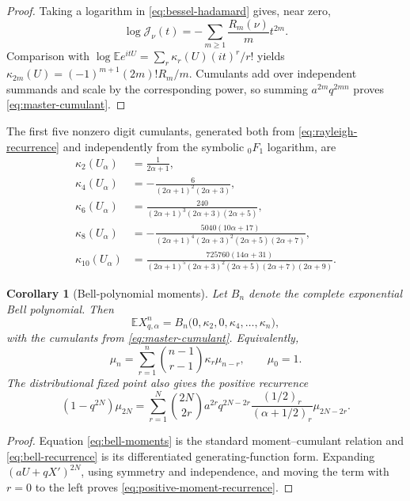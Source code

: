 \documentclass[11pt]{article}
\newtheorem{corollary}[theorem]{Corollary}
\theoremstyle{definition}
\theoremstyle{remark}
\newcommand{\E}{\mathbb{E}}
\newcommand{\Jcal}{\mathcal{J}}
\newcommand{\poch}[2]{\left(#1\right)_{#2}}
\begin{document}
\begin{proof}
Taking a logarithm in \eqref{eq:bessel-hadamard} gives, near zero,
\[
 \log\Jcal_\nu(t)=-\sum_{m\ge1}\frac{R_m(\nu)}m t^{2m}.
\]
Comparison with
\(\log\E e^{itU}=\sum_r\kappa_r(U)(it)^r/r!\) yields
\(\kappa_{2m}(U)=(-1)^{m+1}(2m)!R_m/m\).  Cumulants add over independent
summands and scale by the corresponding power, so summing
\(a^{2m}q^{2mn}\) proves \eqref{eq:master-cumulant}.
\end{proof}

The first five nonzero digit cumulants, generated both from
\eqref{eq:rayleigh-recurrence} and independently from the symbolic
\({}_0F_1\) logarithm, are
\begin{align}
 \kappa_2(U_\alpha)&=\frac1{2\alpha+1},\label{eq:k2}\\
 \kappa_4(U_\alpha)&=-\frac6{(2\alpha+1)^2(2\alpha+3)},\label{eq:k4}\\
 \kappa_6(U_\alpha)&=\frac{240}
 {(2\alpha+1)^3(2\alpha+3)(2\alpha+5)},\label{eq:k6}\\
 \kappa_8(U_\alpha)&=-\frac{5040(10\alpha+17)}
 {(2\alpha+1)^4(2\alpha+3)^2(2\alpha+5)(2\alpha+7)},\label{eq:k8}\\
 \kappa_{10}(U_\alpha)&=\frac{725760(14\alpha+31)}
 {(2\alpha+1)^5(2\alpha+3)^2(2\alpha+5)(2\alpha+7)(2\alpha+9)}.
 \label{eq:k10}
\end{align}

\begin{corollary}[Bell-polynomial moments]
\label{cor:bell-moments}
Let \(B_n\) denote the complete exponential Bell polynomial.  Then
\begin{equation}
 \E X_{q,\alpha}^n
 =B_n\bigl(0,\kappa_2,0,\kappa_4,\ldots,\kappa_n\bigr),
 \label{eq:bell-moments}
\end{equation}
with the cumulants from \eqref{eq:master-cumulant}.  Equivalently,
\begin{equation}
 \mu_n=\sum_{r=1}^{n}\binom{n-1}{r-1}\kappa_r\mu_{n-r},
 \qquad \mu_0=1.
 \label{eq:bell-recurrence}
\end{equation}
The distributional fixed point also gives the positive recurrence
\begin{equation}
 (1-q^{2N})\mu_{2N}
 =\sum_{r=1}^{N}\binom{2N}{2r}
 a^{2r}q^{2N-2r}
 \frac{\poch{1/2}{r}}{\poch{\alpha+1/2}{r}}
 \mu_{2N-2r}.
 \label{eq:positive-moment-recurrence}
\end{equation}
\end{corollary}

\begin{proof}
Equation \eqref{eq:bell-moments} is the standard moment--cumulant relation and
\eqref{eq:bell-recurrence} is its differentiated generating-function form.
Expanding \((aU+qX')^{2N}\), using symmetry and independence, and moving the
term with \(r=0\) to the left proves \eqref{eq:positive-moment-recurrence}.
\end{proof}
\end{document}
